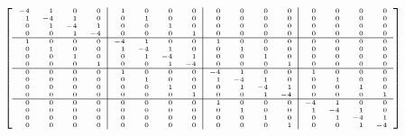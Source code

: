 \documentclass[a4paper]{article}
\begin{document}
\begin{equation}
\left[
\tiny
\begin{array}{rrrr|rrrr|rrrr|rrrr}
    -4 & 1 & 0 & 0 & 1 & 0 & 0 & 0 & 0 & 0 & 0 & 0 & 0 & 0 & 0 & 0 \\
    1 & -4 & 1 & 0 & 0 & 1 & 0 & 0 & 0 & 0 & 0 & 0 & 0 & 0 & 0 & 0 \\
    0 & 1 & -4 & 1 & 0 & 0 & 1 & 0 & 0 & 0 & 0 & 0 & 0 & 0 & 0 & 0 \\
    0 & 0 & 1 & -4 & 0 & 0 & 0 & 1 & 0 & 0 & 0 & 0 & 0 & 0 & 0 & 0 \\
\hline
    1 & 0 & 0 & 0 & -4 & 1 & 0 & 0 & 1 & 0 & 0 & 0 & 0 & 0 & 0 & 0 \\
    0 & 1 & 0 & 0 & 1 & -4 & 1 & 0 & 0 & 1 & 0 & 0 & 0 & 0 & 0 & 0 \\
    0 & 0 & 1 & 0 & 0 & 1 & -4 & 1 & 0 & 0 & 1 & 0 & 0 & 0 & 0 & 0 \\
    0 & 0 & 0 & 1 & 0 & 0 & 1 & -4 & 0 & 0 & 0 & 1 & 0 & 0 & 0 & 0 \\
    \hline
     0 & 0 & 0 & 0 &1 & 0 & 0 & 0 & -4 & 1 & 0 & 0 & 1 & 0 & 0 & 0 \\
     0 & 0 & 0 & 0 & 0 & 1 & 0 & 0 & 1 & -4 & 1 & 0 & 0 & 1 & 0 & 0 \\
     0 & 0 & 0 & 0 & 0 & 0 & 1 & 0 & 0 & 1 & -4 & 1 & 0 & 0 & 1 & 0 \\
     0 & 0 & 0 & 0 & 0 & 0 & 0 & 1 & 0 & 0 & 1 & -4 & 0 & 0 & 0 & 1 \\
    \hline
    0 & 0 & 0 & 0 & 0 & 0 & 0 & 0 &1 & 0 & 0 & 0 & -4 & 1 & 0 & 0  \\
    0 & 0 & 0 & 0 & 0 & 0 & 0 & 0 & 0 & 1 & 0 & 0 & 1 & -4 & 1 & 0 \\
    0 & 0 & 0 & 0 & 0 & 0 & 0 & 0 & 0 & 0 & 1 & 0 & 0 & 1 & -4 & 1 \\
    0 & 0 & 0 & 0 & 0 & 0 & 0 & 0 & 0 & 0 & 0 & 1 & 0 & 0 & 1 & -4 \\

\end{array}
\right]
\label{eq:mat4x4}
\end{equation}



\end{document}

